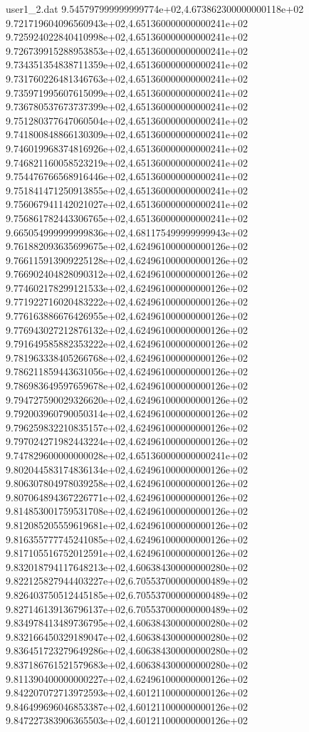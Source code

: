 \begin{filecontents}{user1_2.dat}
9.545797999999999774e+02,4.673862300000000118e+02
9.721719604096560943e+02,4.651360000000000241e+02
9.725924022840410998e+02,4.651360000000000241e+02
9.726739915288953853e+02,4.651360000000000241e+02
9.734351354838711359e+02,4.651360000000000241e+02
9.731760226481346763e+02,4.651360000000000241e+02
9.735971995607615099e+02,4.651360000000000241e+02
9.736780537673737399e+02,4.651360000000000241e+02
9.751280377647060504e+02,4.651360000000000241e+02
9.741800848866130309e+02,4.651360000000000241e+02
9.746019968374816926e+02,4.651360000000000241e+02
9.746821160058523219e+02,4.651360000000000241e+02
9.754476766568916446e+02,4.651360000000000241e+02
9.751841471250913855e+02,4.651360000000000241e+02
9.756067941142021027e+02,4.651360000000000241e+02
9.756861782443306765e+02,4.651360000000000241e+02
9.665054999999999836e+02,4.681175499999999943e+02
9.761882093635699675e+02,4.624961000000000126e+02
9.766115913909225128e+02,4.624961000000000126e+02
9.766902404828090312e+02,4.624961000000000126e+02
9.774602178299121533e+02,4.624961000000000126e+02
9.771922716020483222e+02,4.624961000000000126e+02
9.776163886676426955e+02,4.624961000000000126e+02
9.776943027212876132e+02,4.624961000000000126e+02
9.791649585882353222e+02,4.624961000000000126e+02
9.781963338405266768e+02,4.624961000000000126e+02
9.786211859443631056e+02,4.624961000000000126e+02
9.786983649597659678e+02,4.624961000000000126e+02
9.794727590029326620e+02,4.624961000000000126e+02
9.792003960790050314e+02,4.624961000000000126e+02
9.796259832210835157e+02,4.624961000000000126e+02
9.797024271982443224e+02,4.624961000000000126e+02
9.747829600000000028e+02,4.651360000000000241e+02
9.802044583174836134e+02,4.624961000000000126e+02
9.806307804978039258e+02,4.624961000000000126e+02
9.807064894367226771e+02,4.624961000000000126e+02
9.814853001759531708e+02,4.624961000000000126e+02
9.812085205559619681e+02,4.624961000000000126e+02
9.816355777745241085e+02,4.624961000000000126e+02
9.817105516752012591e+02,4.624961000000000126e+02
9.832018794117648213e+02,4.606384300000000280e+02
9.822125827944403227e+02,6.705537000000000489e+02
9.826403750512445185e+02,6.705537000000000489e+02
9.827146139136796137e+02,6.705537000000000489e+02
9.834978413489736795e+02,4.606384300000000280e+02
9.832166450329189047e+02,4.606384300000000280e+02
9.836451723279649286e+02,4.606384300000000280e+02
9.837186761521579683e+02,4.606384300000000280e+02
9.811390400000000227e+02,4.624961000000000126e+02
9.842207072713972593e+02,4.601211000000000126e+02
9.846499696046853387e+02,4.601211000000000126e+02
9.847227383906365503e+02,4.601211000000000126e+02

\end{filecontents}
